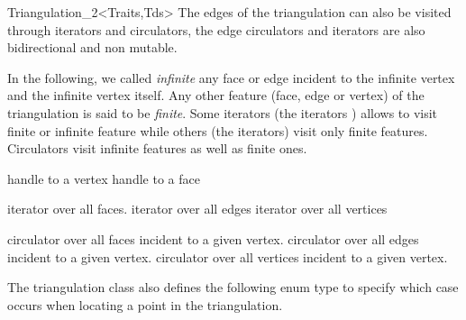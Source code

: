 \begin{ccRefClass}{Triangulation_2<Traits,Tds>}
The edges of the triangulation can also be visited through iterators
and circulators,
the edge circulators and iterators
are also bidirectional and non mutable.

In the following, we called {\it infinite} any face or edge 
incident  to the infinite vertex and the infinite vertex itself.
 Any other feature (face, edge or vertex) of the triangulation is said 
to be {\it finite}.
Some iterators (the  iterators ) allows to visit finite or 
infinite feature while others (the  iterators) visit only
finite features. Circulators visit infinite features as well as finite 
ones.

{handle to a vertex}
\ccGlue
{}
{handle to a face}


{iterator over all faces.}
\ccGlue
{}
{iterator over all edges}
\ccGlue
{}
{iterator over all vertices}

\ccGlue
{}
\ccGlue
{}
\ccGlue
{} 




{circulator over all faces incident to a given vertex.}
\ccGlue
{}
{circulator over all  edges incident to a given vertex.}
\ccGlue
{}
{circulator over all vertices incident to a given vertex.}

The triangulation class also defines the following enum type to specify
which case occurs when locating a point in the triangulation.




\end{ccRefClass}
